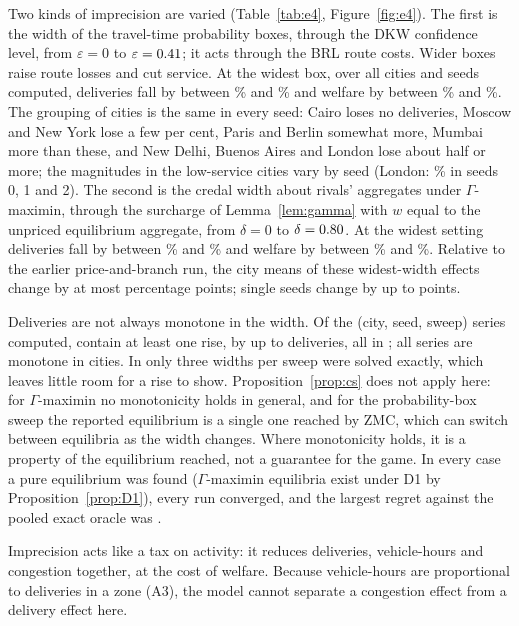 \documentclass[preprint,12pt]{elsarticle}
\theoremstyle{definition}
\theoremstyle{remark}
\begin{document}
Two kinds of imprecision are varied (Table~\ref{tab:e4}, Figure~\ref{fig:e4}). The first is the width of the travel-time probability boxes, through the DKW confidence level, from $\varepsilon=0$ to $\varepsilon=0.41$; it acts through the BRL route costs. Wider boxes raise route losses and cut service. At the widest box, over all cities and seeds computed, deliveries fall by between \EfourPbDelMin\% and \EfourPbDelMax\% and welfare by between \EfourPbWMin\% and \EfourPbWMax\%. The grouping of cities is the same in every seed: Cairo loses no deliveries, Moscow and New York lose a few per cent, Paris and Berlin somewhat more, Mumbai more than these, and New Delhi, Buenos Aires and London lose about half or more; the magnitudes in the low-service cities vary by seed (London: \EfourLondonPb\% in seeds 0, 1 and 2). The second is the credal width about rivals' aggregates under $\Gamma$-maximin, through the surcharge of Lemma~\ref{lem:gamma} with $w$ equal to the unpriced equilibrium aggregate, from $\delta=0$ to $\delta=0.80$. At the widest setting deliveries fall by between \EfourGaDelMin\% and \EfourGaDelMax\% and welfare by between \EfourGaWMin\% and \EfourGaWMax\%. Relative to the earlier price-and-branch run, the city means of these widest-width effects change by at most \ExEfourMeanChangeMax{} percentage points; single seeds change by up to \ExEfourSeedChangeMax{} points.

Deliveries are not always monotone in the width. Of the \EfourSeries{} (city, seed, sweep) series computed, \EfourNonMonoN{} contain at least one rise, by up to \EfourMaxRise{} deliveries, all in \EfourNonMonoCities; all series are monotone in \EfourMonoCitiesN{} cities. In \ExEfourRedCities{} only three widths per sweep were solved exactly, which leaves little room for a rise to show. Proposition~\ref{prop:cs} does not apply here: for $\Gamma$-maximin no monotonicity holds in general, and for the probability-box sweep the reported equilibrium is a single one reached by ZMC, which can switch between equilibria as the width changes. Where monotonicity holds, it is a property of the equilibrium reached, not a guarantee for the game. In every case a pure equilibrium was found ($\Gamma$-maximin equilibria exist under D1 by Proposition~\ref{prop:D1}), every run converged, and the largest regret against the pooled exact oracle was \EfourRegretMax.

Imprecision acts like a tax on activity: it reduces deliveries, vehicle-hours and congestion together, at the cost of welfare. Because vehicle-hours are proportional to deliveries in a zone (A3), the model cannot separate a congestion effect from a delivery effect here.
\end{document}
